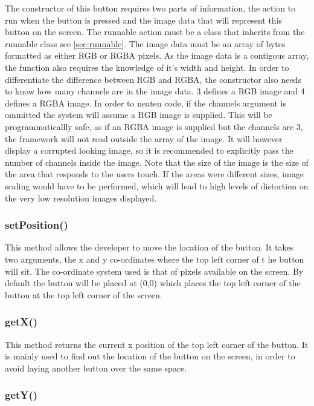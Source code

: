 The constructor of this button requires two parts of information, the action to run when the button is pressed and the image data that will represent this button on the screen. The runnable action must be a class that inherits from the runnable class see \ref{sec:runnable}. The image data must be an array of bytes formatted as either RGB or RGBA pixels. As the image data is a contigous array, the function also requires the knowledge of it's width and height. In order to differentiate the difference between RGB and RGBA, the constructor also needs to know how many channels are in  the image data. 3 defines a RGB image and 4 defines a RGBA image. In order to neaten code, if the channels argument is ommitted the system will assume a RGB image is supplied. This will be programmaticallly safe, as if an RGBA image is supplied but the channels are 3, the framework will not read outside the array of the image. It will however display a corrupted looking image, so it is recommended to explicitly pass the number of channels inside the image. 
Note that the size of the image is the size of the area that responds to the users touch. If the areas were different sizes, image scaling would have to be performed, which will lead to high levels of distortion on the very low resolution images displayed.

\subsubsection{setPosition()}

This method allows the developer to move the location of the button. It takes two arguments, the x and y co-ordinates where the top left corner of t he button will sit. The co-ordinate system used is that of pixels available on the screen. By default the button will be placed at (0,0) which places the top left corner of the button at the top left corner of the screen.

\subsubsection{getX()}

This method returns the current x position of the top left corner of the button. It is mainly used to find out the location of the button on the screen, in order to avoid laying another button over the same space.

\subsubsection{getY()}

